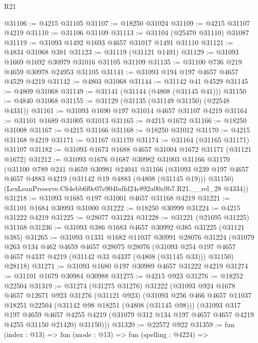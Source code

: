 \begin{lexlean}{R21}
\begin{coremodule}
@31106 := @4215 @31105
@31107 := @18250 @31024
@31109 := @4215 @31107 @4219
@31110 := @31106 @31109
@31113 := @31104 (@25470 @31110) @31087
@31119 := @31093 @1492 @1693 @4657 @31017 @1491 @31110
@31121 := @4834 @31068 @381
@31123 := @31119 (@31121 @1491)
@31129 := @31093 @1669 @1692 @30979 @31016 @31105 @31109
@31135 := @31100 @736 @219 @4659 @30978 @24953 @31105
@31141 := @31093 @194 @197 @4657 @4657 @4529 @4219
@31142 := @4803 @31068
@31144 := @31142 @41 @4529
@31145 := @4809 @31068
@31149 := @31141 (@31144 (@4808 (@31145 @41)))
@31150 := @4840 @31068
@31155 := @31129 (@31135 (@31149 @31150) (@22548 @4331))
@31161 := @31093 @1690 @197 @31014 @4657 @31107 @4219
@31164 := @31101 @1689 @31005 @31013
@31165 := @4215 @1672
@31166 := @18250 @31008
@31167 := @4215 @31166
@31168 := @18250 @31012
@31170 := @4215 @31168 @4219
@31171 := @31167 @31170
@31174 := @31164 (@31165 @31171) @31107
@31182 := @31093 @1673 @1688 @4657 @31004 @1672 @31171 (@31121 @1672)
@31212 := @31093
    @1676
    @1687
    @30982
    @31003
    @31166
    @31170
    (@31100
      @789
      @241
      @4659
      @30981
      @24041
      @31166
      (@31093 @239 @197 @4657 @4657 @4883 @4219 (@31142 @19 @4883 (@4808 (@31145 @19))) @31150)
      (LexLeanPreserve.C64ebb6f0c07e904bdfd24c892a00a9b7.R21.__rel_28 @4334))
@31218 := @31093 @1685 @197 @31001 @4657 @31168 @4219
@31221 := @31101 @1684 @30993 @31000
@31222 := @18250 @30999
@31224 := @4215 @31222 @4219
@31225 := @28077 @31224
@31228 := @31221 (@21695 @31225) @31168
@31236 := @31093 @386 @1683 @4657 @30992 @385 @31225 (@31121 @385)
@31265 := @31093
    @1331
    @1682
    @11037
    @30991
    @28076
    @31224
    (@31079
      @263
      @134
      @462
      @4659
      @4657
      @28075
      @28076
      (@31093 @254 @197 @4657 @4657 @4337 @4219 (@31142 @33 @4337 (@4808 (@31145 @33))) @31150)
      @28118)
@31271 := @31093 @1680 @197 @30989 @4657 @31222 @4219
@31274 := @31101 @1679 @30984 @30988
@31275 := @4215 @923
@31276 := @18252 @22504
@31319 := @31274
    (@31275 @31276)
    @31222
    (@31093
      @924
      @1678
      @4657
      @12671
      @923
      @31276
      (@31121 @923)
      (@31093
        @256
        @466
        @4657
        @11037
        @18251
        @22504
        (@31142 @98 @18251 (@4808 (@31145 @98)))
        (@31093
          @317
          @197
          @4659
          @4657
          @4255
          @4219
          (@31079 @312 @134 @197 @4657 @4657 @4219 @4255 @31150 @21420)
          @31150)))
@31320 := @22572 @922
@31359 := fun (index : @13) =>
  fun (mode : @13) =>
  fun (spelling : @4224) =>

\end{coremodule}
\end{lexlean}
